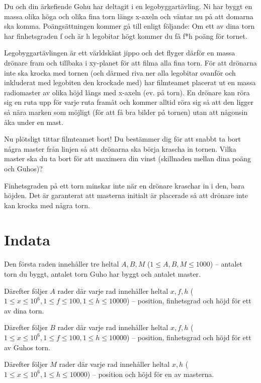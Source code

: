 

Du och din ärkefiende Gohu har deltagit i en legobyggartävling.
Ni har byggt en massa olika höga och olika fina torn längs x-axeln och väntar nu på att domarna ska komma.
Poängsättningen kommer gå till enligt följande: Om ett av dina torn har finhetsgraden f och är h legobitar högt kommer du få f*h poäng för tornet.

Legobyggartävlingen är ett världskänt jippo och det flyger därför en massa drönare fram och tillbaka i xy-planet för att filma alla fina torn.
För att drönarna inte ska krocka med tornen (och därmed riva ner alla legobitar ovanför och inkluderat med legobiten den krockade med) har filmteamet placerat ut en massa radiomaster av olika höjd längs med x-axeln (ev. på torn).
En drönare kan röra sig en ruta upp för varje ruta framåt och kommer alltid röra sig så att den ligger så nära marken som möjligt (för att få bra bilder på tornen) utan att någonsin åka under en mast.

Nu plötsligt tittar filmteamet bort!
Du bestämmer dig för att snabbt ta bort några master från linjen så att drönarna ska börja krascha in tornen.
Vilka master ska du ta bort för att maximera din vinst (skillnaden mellan dina poäng och Guhos)?

Finhetsgraden på ett torn minskar inte när en drönare kraschar in i den, bara höjden.
Det är garanterat att masterna initialt är placerade så att drönare inte kan krocka med några torn.


\section*{Indata}
Den första raden innehåller tre heltal $A,B,M$ ($1 \leq A,B,M \leq 1000$) -- antalet torn du byggt, antalet torn Guho har byggt och antalet master.

Därefter följer $A$ rader där varje rad innehåller heltal $x,f,h$ ($1 \leq x \leq 10^6, 1 \le f \le 100, 1\leq h \leq 10000$) -- position, finhetsgrad och höjd för ett av dina torn.

Därefter följer $B$ rader där varje rad innehåller heltal $x,f,h$ ($1 \leq x \leq 10^6, 1 \le f \le 100, 1\leq h \leq 10000$) -- position, finhetsgrad och höjd för ett av Guhos torn.

Därefter följer $M$ rader där varje rad innehåller heltal $x,h$ ($1 \leq x \leq 10^6, 1\leq h \leq 10000$) -- position och höjd för en av masterna.

